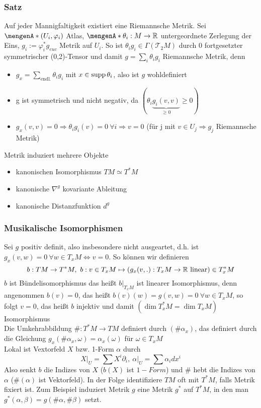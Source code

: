 \subsubsection{Satz}
\label{ssub:25}
Auf jeder Mannigfaltigkeit existiert eine Riemannsche Metrik.
Sei $\set{(U_i,\varphi_i)}$ Atlas, $\set{\theta_i:M\to\mathds{R}}$ untergeordnete Zerlegung der Eins, $g_i:=\varphi_i^*g_{euc}$ Metrik auf $U_i$. So ist $\theta_i g_i\in\Gamma(\mathcal{T}_2 M)$ durch 0 fortgesetzter symmetrischer (0,2)-Tensor und damit $g=\sum_i \theta_i g_i$ Riemannsche Metrik, denn 
\begin{itemize}
\item $g_x=\sum_{\text{endl.}} \theta_i g_i$ mit $x\in \operatorname{supp} \theta_i$, also ist $g$ wohldefiniert
\item g ist symmetrisch und nicht negativ, da $(\theta_i\underset{\geq 0}{\underbrace{g_i(v,v)}}\geq 0)$
\item $g_x(v,v)=0\Rightarrow \theta_ig_i(v)=0~\forall i\Rightarrow v=0$ (für j mit $v\in U_j\Rightarrow g_j$ Riemannsche Metrik)
\end{itemize}

Metrik induziert mehrere Objekte 
\begin{itemize}
\item kanonischen Isomorphismus $TM\simeq T^*M$
\item kanonische $\nabla^g$ kovariante Ableitung
\item kanonische Distanzfunktion $d^g$
\end{itemize}

\subsubsection{Musikalische Isomorphismen}
\label{ssub:26}
Sei $g$ positiv definit, also insbesondere nicht ausgeartet, d.h. ist $g_x(v,w)=0~\forall w\in T_xM\iff v=0$. So können wir definieren
\[
b:TM\to T^* M,\ b: v\in T_x M\mapsto \enbrace*{g_x (v,.):T_x M\to\mathds{R}\ \text{linear}}\in T_x^* M
\]
$b$ ist Bündelisomorphismus das heißt $b\vert_{T_x M}$ ist linearer Isomorphismus, denn angenommen $b(v)=0$, das heißt $b(v)(w) = g(v,w) = 0\ \forall w\in T_x M$, so folgt $v=0$, das heißt $b$ injektiv und damit $(\dim T_x^* M = \dim T_x M)$ Isomorphismus\\
Die Umkehrabbildung $\#:T^* M\to TM$ definiert durch $(\#\alpha_x)$, das definiert durch die Gleichung $g_x(\#\alpha_x,\omega)=\alpha_x(\omega)$ für $\omega\in T_x M$\\
Lokal ist Vextorfeld $X$ bzw. 1-Form $\alpha$ durch 
\[X\vert_U=\sum X^i\partial_i,\ \alpha\vert_U=\sum\alpha_idx^i\]
Also senkt $b$ die Indizes von $X$ ($b(X)$ ist $1-Form$) und $\#$ hebt die Indizes von $\alpha$ ($\#(\alpha)$ ist Vektorfeld).
In der Folge identifiziere $TM$ oft mit $T^*M$, falls Metrik fixiert ist. Zum Beispiel induziert Metrik $g$ eine Metrik $g^*$ auf $T^* M$, in den man $g^*(\alpha,\beta)=g(\#\alpha,\#\beta)$ setzt. 

